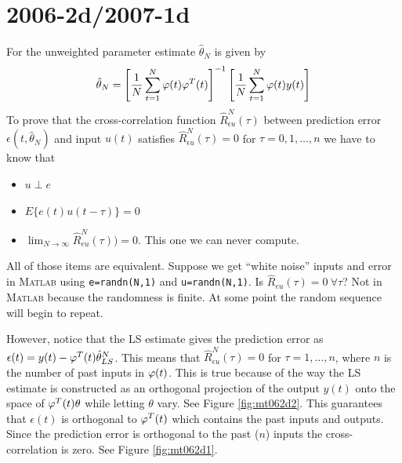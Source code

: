\documentclass[lecture,12pt,]{pcms-l}
\begin{document}
\mainmatter
\setcounter{page}{1}

\lectureseries[\course]{\course}

\date{November 5, 2009}

\setaddress

\setcounter{lecture}{20}
\setcounter{chapter}{20}


\section{2006-2d/2007-1d}
For the unweighted parameter estimate $\hat{\theta}_N$ is given by
$$\hat{\theta}_N = \left[\frac{1}{N}\sum_{t=1}^N\varphi(t)\varphi^T(t)\right]^{-1}\left[\frac{1}{N}\sum_{t=1}^N\varphi(t)y(t)\right]$$
To prove that the cross-correlation function $\hat{R}_{\epsilon u}^N(\tau)$ between prediction error $\epsilon(t,\hat{\theta}_N)$ and input $u(t)$ satisfies $\hat{R}_{\epsilon u}^N(\tau)=0$ for $\tau=0,1,\ldots,n$ we have to know that
\begin{itemize}
\item $u\perp e$
\item $E\{e(t)u(t-\tau)\}=0$
\item $\lim_{N\to\infty}\hat{R}_{eu}^N(\tau))=0$. This one we can never compute.
\end{itemize}
All of those items are equivalent. Suppose we get ``white noise'' inputs and error in \textsc{Matlab} using \texttt{e=randn(N,1)} and \texttt{u=randn(N,1)}. Is $\hat{R}_{eu}(\tau)=0 ~\forall \tau$? Not in \textsc{Matlab} because the randomness is finite. At some point the random sequence will begin to repeat.

However, notice that the LS estimate gives the prediction error as $\epsilon(t)=y(t)-\varphi^T(t)\hat{\theta}_{LS}^N$. This means that $\hat{R}_{\epsilon u}^N(\tau)=0$ for $\tau=1,\ldots,n$, where $n$ is the number of past inputs in $\varphi(t)$. This is true because of the way the LS estimate is constructed as an orthogonal projection of the output $y(t)$ onto the space of $\varphi^T(t)\theta$ while letting $\theta$ vary. See Figure \ref{fig:mt062d2}. This guarantees that $\epsilon(t)$ is orthogonal to $\varphi^T(t)$ which contains the past inputs and outputs. Since the prediction error is orthogonal to the past ($n$) inputs the cross-correlation is zero. See Figure \ref{fig:mt062d1}.
\end{document}
